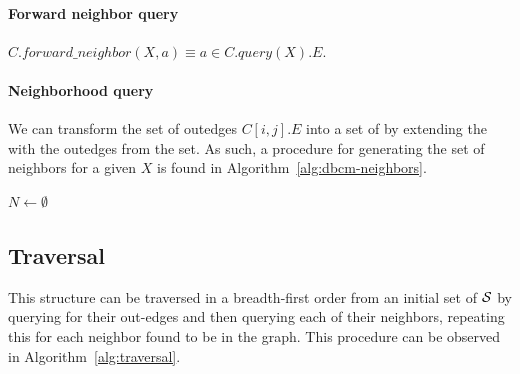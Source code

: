 \paragraph*{Forward neighbor query} $C.\mathit{forward\_neighbor}(X, a) \equiv a\in C.\mathit{query}(X).E$.

\paragraph*{Neighborhood query} We can transform the set of outedges $C[i,j].E$ into a set of  by extending the \kmer with the outedges from the set. As such, a procedure for generating the set of neighbors for a given \kmer $X$ is found in Algorithm~\ref{alg:dbcm-neighbors}.

\begin{algorithm}
	\caption{$C.\mathit{neighbors}(X)$}\label{alg:dbcm-neighbors}
  $N \gets \emptyset$\\
\end{algorithm}

\subsection{\dBCM Traversal}
\label{subsubsec:dbcm-navigation}

This structure can be traversed in a breadth-first order from an initial set of  $\strsetname{S}$ by querying for their out-edges and then querying each of their neighbors, repeating this for each neighbor found to be in the graph. This procedure can be observed in Algorithm~\ref{alg:traversal}.


